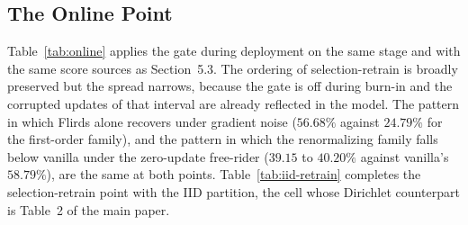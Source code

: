 \documentclass[letterpaper]{article} %
\theoremstyle{plain}
\begin{document}
\subsection{The Online Point}
\label{app:online}

Table~\ref{tab:online} applies the gate during deployment on the same stage
and with the same score sources as Section~5.3. The ordering of
selection-retrain is broadly preserved but the spread narrows, because the
gate is off during burn-in and the corrupted updates of that interval are
already reflected in the model. The pattern in which Flirds alone recovers
under gradient noise ($56.68\%$ against $24.79\%$ for the first-order
family), and the pattern in which the renormalizing family falls below
vanilla under the zero-update free-rider ($39.15$ to $40.20\%$ against
vanilla's $58.79\%$), are the same at both points.
Table~\ref{tab:iid-retrain} completes the selection-retrain point with the
IID partition, the cell whose Dirichlet counterpart is Table~2 of the main
paper.
\end{document}
